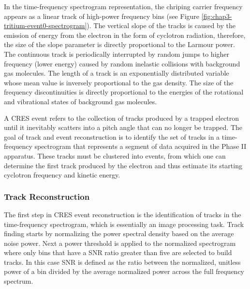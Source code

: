 In the time-frequency spectrogram representation, the chriping carrier frequency appears as a linear track of high-power frequency bins (see Figure \ref{fig:chap3-tritium-event0-spectrogram}). The vertical slope of the tracks is caused by the emission of energy from the electron in the form of cyclotron radiation, therefore, the size of the slope parameter is directly proportional to the Larmour power. The continuous track is periodically interrupted by random jumps to higher frequency (lower energy) caused by random inelastic collisions with background gas molecules. The length of a track is an exponentially distributed variable whose mean value is inversely proportional to the gas density. The size of the frequency discontinuities is directly proportional to the energies of the rotational and vibrational states of background gas molecules. 

A CRES event refers to the collection of tracks produced by a trapped electron until it inevitably scatters into a pitch angle that can no longer be trapped. The goal of track and event reconstruction is to identify the set of tracks in a time-frequency spectrogram that represents a segment of data acquired in the Phase II apparatus. These tracks must be clustered into events, from which one can determine the first track produced by the electron and thus estimate its starting cyclotron frequency and kinetic energy. 

\subsubsection*{Track Reconstruction}

The first step in CRES event reconstruction is the identification of tracks in the time-frequency spectrogram, which is essentially an image processing task. Track finding starts by normalizing the power spectral density based on the average noise power. Next a power threshold is applied to the normalized spectrogram where only bins that have a SNR ratio greater than five are selected to build tracks. In this case SNR is defined as the ratio between the normalized, unitless power of a bin divided by the average normalized power across the full frequency spectrum.

